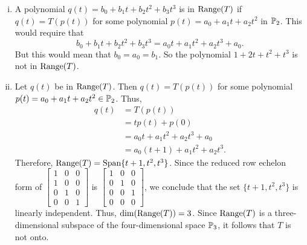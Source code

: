 \begin{example}
\begin{enumerate}[i.]
	\item A polynomial $q(t) = b_0+b_1t+b_2t^2+b_3t^3$ is in $\text{Range}(T)$ if $q(t) = T(p(t))$ for some polynomial $p(t) = a_0+a_1t+a_2t^2$ in $\mathbb{P}_2$. This would require that 
	\[b_0+b_1t+b_2t^2+b_3t^3 = a_0t+a_1t^2+a_2t^3+a_0.\]
	But this would mean that $b_0 = a_0 = b_1$. So the polynomial $1+2t+t^2+t^3$ is not in $\text{Range}(T)$. 	
		
	\item Let $q(t)$ be in $\text{Range}(T)$. Then $q(t) = T(p(t))$ for some polynomial $p(t) = a_0+a_1t+a_2t^2 \in \mathbb{P}_2$. Thus,
\begin{align*}
q(t) &= T(p(t)) \\
	&= tp(t) + p(0) \\
	&= a_0t+a_1t^2+a_2t^3 + a_0 \\
	&= a_0(t+1) + a_1t^2 +a_2t^3.
\end{align*}
Therefore, $\text{Range}(T) = \text{Span}\{t+1, t^2, t^3\}$. Since the reduced row echelon form of $\left[ \begin{array}{ccc} 1&0&0\\1&0&0\\0&1&0\\0&0&1 \end{array} \right]$ is $\left[ \begin{array}{ccc} 1&0&0\\0&1&0\\0&0&1\\0&0&0 \end{array} \right]$, we conclude that the set $\{t+1, t^2, t^3\}$ is linearly independent. Thus, $\dim(\text{Range}(T)) = 3$. Since $\text{Range}(T)$ is a three-dimensional subspace of the four-dimensional space $\mathbb{P}_3$, it follows that $T$ is not onto. 

	\end{enumerate}
\ea

\end{example}


